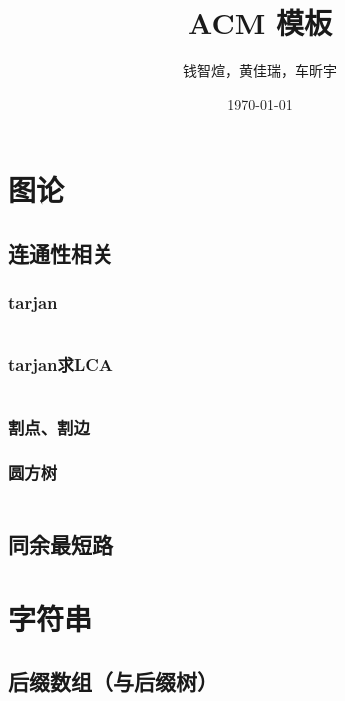 \documentclass[12pt, a4paper, oneside]{ctexart}
\title{ACM 模板}
\author{钱智煊，黄佳瑞，车昕宇}
\date{\today}
\begin{document}
    \scriptsize
    \maketitle
    \newpage
    
    \begin{multicols}{2}
        \tableofcontents
        \newpage

        \section{图论}
        \subsection{连通性相关}
        \subsubsection{tarjan}
        \inputminted{cpp}{src/graph/tarjan.cpp}
        \subsubsection{tarjan求LCA}
        
        \inputminted{cpp}{src/graph/tarjan_lca.cpp}
        \subsubsection{割点、割边}
        
        \subsubsection{圆方树}
        
        \inputminted{cpp}{src/graph/圆方树.cpp}
        \subsection{同余最短路}
        
        \section{字符串}
        \subsection{后缀数组（与后缀树）}
        \inputminted{cpp}{src/string/SA.cpp}
    \end{multicols}
\end{document}
